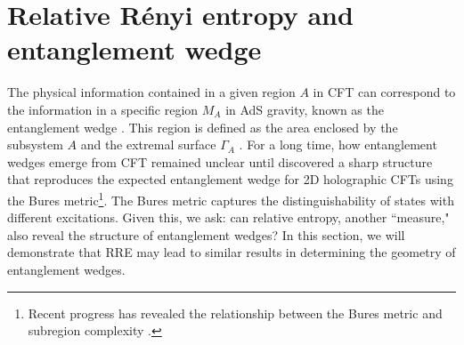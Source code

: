 \documentclass[12pt]{article}
\begin{document}
\section{Relative R\'enyi entropy and entanglement wedge}\label{section5}
 The physical information contained in a given region \( A \) in CFT can correspond to the information in a specific region \( M_A \) in AdS gravity, known as the entanglement wedge \cite{Czech:2012bh, Wall:2012uf, Headrick:2014cta}. This region is defined as the area enclosed by the subsystem \( A \) and the extremal surface \( \Gamma_A \) \cite{Ryu:2006bv}. For a long time, how entanglement wedges emerge from CFT remained unclear until \cite{Suzuki:2019xdq} discovered a sharp structure that reproduces the expected entanglement wedge for 2D holographic CFTs using the Bures metric\footnote{Recent progress has revealed the relationship between the Bures metric and subregion complexity \cite{Gerbershagen:2024qlz}.}. The Bures metric captures the distinguishability of states with different excitations. Given this, we ask: can relative entropy, another ``measure," also reveal the structure of entanglement wedges? In this section, we will demonstrate that RRE may lead to similar results in determining the geometry of entanglement wedges.
\end{document}
